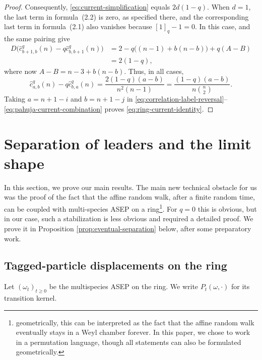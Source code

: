 \documentclass[11pt,a4paper]{amsart}
\theoremstyle{definition}
\theoremstyle{remark}
\numberwithin{equation}{section}
\begin{document}
\begin{proof}
		Consequently, \eqref{eq:current-simplification} equals $2d(1-q)$.  When $d=1$, the
		last term in formula~(2.2) is zero, as specified there, and the corresponding
		last term in formula~(2.1) also vanishes because $[1]_q-1=0$.  In this case,
		\cite[Theorem~2.1]{PahujaCorrelations} and the same pairing give
		\begin{align*}
			D\bigl(\widehat c_{b+1,b}^q(n)-q\widehat c_{b,b+1}^q(n)\bigr)
			&=2-q\bigl((n-1)+b(n-b)\bigr)+q(A-B)\\
			&=2(1-q),
		\end{align*}
		where now $A-B=n-3+b(n-b)$.  Thus, in all cases,
		\begin{equation}\label{eq:pahuja-current-combination}
			\widehat c_{a,b}^q(n)-q\widehat c_{b,a}^q(n)
			=\frac{2(1-q)(a-b)}{n^2(n-1)}
			=\frac{(1-q)(a-b)}{n\binom n2}.
		\end{equation}
		Taking $a=n+1-i$ and $b=n+1-j$ in
		\eqref{eq:correlation-label-reversal}--
		\eqref{eq:pahuja-current-combination} proves
		\eqref{eq:ring-current-identity}.
	\end{proof}
	
	\section{Separation of leaders and the limit shape}\label{sec:limit-shape}
	
	In this section, we prove our main results. The main new technical obstacle for us was the proof of the fact that the affine random walk, after a finite random time, can be coupled with multi-species ASEP on a ring\footnote{geometrically, this can be interpreted as the fact that the affine random walk eventually stays in a Weyl chamber forever. In this paper, we chose to work in a permutation language, though all statements can also be formulated geometrically.}. For $q=0$ this is obvious, but in our case, such a stabilization is less obvious and required a detailed proof. We prove it in Proposition \ref{prop:eventual-separation} below, after some preparatory work.  
	
	\subsection{Tagged-particle displacements on the ring}
	\label{subsec:ring-displacements}
	
	Let $(\omega_t)_{t\ge0}$ be the multispecies ASEP on the ring.  We write
	$P_t(\omega,\cdot)$ for its transition kernel.
	
\end{document}
